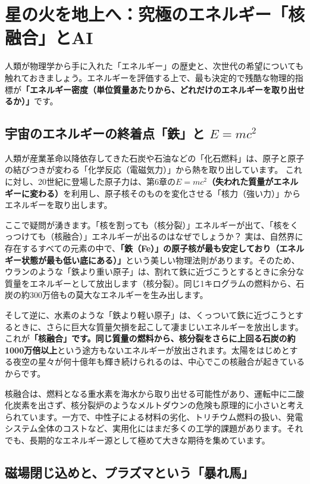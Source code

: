 \section{星の火を地上へ：究極のエネルギー「核融合」とAI}

人類が物理学から手に入れた「エネルギー」の歴史と、次世代の希望についても触れておきましょう。エネルギーを評価する上で、最も決定的で残酷な物理的指標が\textbf{「エネルギー密度（単位質量あたりから、どれだけのエネルギーを取り出せるか）」}です。

\subsection{宇宙のエネルギーの終着点「鉄」と \(E=mc^2\)}

人類が産業革命以降依存してきた石炭や石油などの「化石燃料」は、原子と原子の結びつきが変わる「化学反応（電磁気力）」から熱を取り出しています。 これに対し、20世紀に登場した原子力は、第6章の\textbf{\(E=mc^2\)（失われた質量がエネルギーに変わる）}を利用し、原子核そのものを変化させる「核力（強い力）」からエネルギーを取り出します。

ここで疑問が湧きます。「核を割っても（核分裂）」エネルギーが出て、「核をくっつけても（核融合）」エネルギーが出るのはなぜでしょうか？ 実は、自然界に存在するすべての元素の中で、\textbf{「鉄（Fe）」の原子核が最も安定しており（エネルギー状態が最も低い底にある）」}という美しい物理法則があります。そのため、ウランのような「鉄より重い原子」は、割れて鉄に近づこうとするときに余分な質量をエネルギーとして放出します（核分裂）。同じ1キログラムの燃料から、石炭の約300万倍もの莫大なエネルギーを生み出します。

そして逆に、水素のような「鉄より軽い原子」は、くっついて鉄に近づこうとするときに、さらに巨大な質量欠損を起こして凄まじいエネルギーを放出します。これが\textbf{「核融合」です。同じ質量の燃料から、核分裂をさらに上回る石炭の約1000万倍以上}という途方もないエネルギーが放出されます。太陽をはじめとする夜空の星々が何十億年も輝き続けられるのは、中心でこの核融合が起きているからです。

核融合は、燃料となる重水素を海水から取り出せる可能性があり、運転中に二酸化炭素を出さず、核分裂炉のようなメルトダウンの危険も原理的に小さいと考えられています。一方で、中性子による材料の劣化、トリチウム燃料の扱い、発電システム全体のコストなど、実用化にはまだ多くの工学的課題があります。それでも、長期的なエネルギー源として極めて大きな期待を集めています。

\subsection{磁場閉じ込めと、プラズマという「暴れ馬」}

